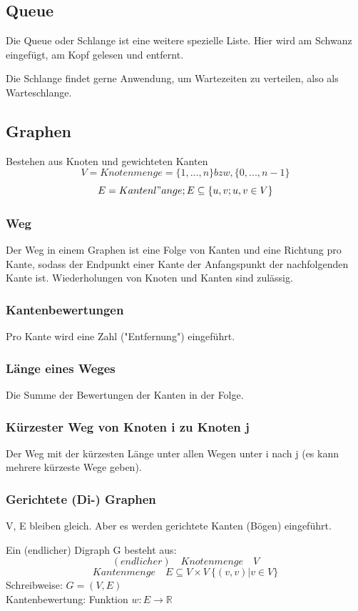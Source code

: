\documentclass[fleqn]{scrartcl}
\begin{document}
\subsection{Queue}
Die Queue oder Schlange ist eine weitere spezielle Liste. Hier wird am Schwanz eingefügt, am Kopf gelesen und entfernt.

Die Schlange findet gerne Anwendung, um Wartezeiten zu verteilen, also als Warteschlange.
\subsection{Graphen}
Bestehen aus Knoten und gewichteten Kanten
\[V = Knotenmenge = \{1, ..., n\} bzw, \{0, ..., n-1\}\]
\[E = Kantenl"ange; E \subseteq \{{u, v}; u,v \in V\}\]
\subsubsection{Weg}
Der Weg in einem Graphen ist eine Folge von Kanten und eine Richtung pro Kante, sodass der Endpunkt einer Kante der Anfangspunkt der nachfolgenden Kante ist. Wiederholungen von Knoten und Kanten sind zulässig.

\subsubsection{Kantenbewertungen}
Pro Kante wird eine Zahl ("Entfernung") eingeführt. 
\subsubsection{Länge eines Weges}
Die Summe der Bewertungen der Kanten in der Folge. 
\subsubsection{Kürzester Weg von Knoten i zu Knoten j}
Der Weg mit der kürzesten Länge unter allen Wegen unter i nach j (es kann mehrere kürzeste Wege geben).

\subsubsection{Gerichtete (Di-) Graphen}
V, E bleiben gleich. Aber es werden gerichtete Kanten (Bögen) eingeführt.

Ein (endlicher) Digraph G besteht aus:
\[(endlicher) \quad Knotenmenge \quad V\]
\[Kantenmenge \quad E \subseteq V \times V \ \{(v, v) | v \in V\}\]
Schreibweise: $G = (V, E)$\\
Kantenbewertung: Funktion $w: E \rightarrow \mathbb{R}$
\end{document}
